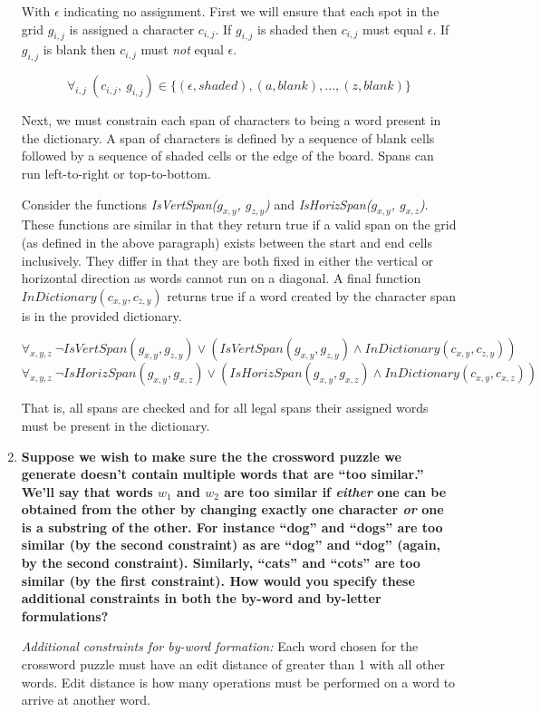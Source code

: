 \documentclass[11pt, letterpaper]{hw}
\begin{document}
\begin{enumerate}
With $\epsilon$ indicating no assignment. First we will ensure that each spot in the grid $g_{i ,j}$ is assigned a character $c_{i, j}$. If $g_{i, j}$ is shaded then $c_{i, j}$ must equal $\epsilon$. If $g_{i, j}$ is blank then $c_{i, j}$ must \textit{not} equal $\epsilon$.

$$\forall_{i, j} \ (c_{i, j}, \ g_{i, j}) \in \{(\epsilon, shaded), (a, blank), ... , (z, blank)\}$$

Next, we must constrain each span of characters to being a word present in the dictionary. A span of characters is defined by a sequence of blank cells followed by a sequence of shaded cells or the edge of the board. Spans can run left-to-right or top-to-bottom.

Consider the functions \textit{IsVertSpan($g_{x, y}$, $g_{z, y}$)} and \textit{IsHorizSpan($g_{x, y}$, $g_{x, z}$)}. These functions are similar in that they return true if a valid span on the grid (as defined in the above paragraph) exists between the start and end cells inclusively. They differ in that they are both fixed in either the vertical or horizontal direction as words cannot run on a diagonal. A final function $InDictionary(c_{x, y}, c_{z,y})$ returns true if a word created by the character span is in the provided dictionary.

$$\forall_{x, y, z} \ \neg IsVertSpan(g_{x, y}, g_{z, y}) \lor (IsVertSpan(g_{x, y}, g_{z, y}) \land InDictionary(c_{x, y}, c_{z,y}))$$
$$\forall_{x, y, z} \ \neg IsHorizSpan(g_{x, y}, g_{x, z}) \lor (IsHorizSpan(g_{x, y}, g_{x, z}) \land InDictionary(c_{x, y}, c_{x,z}))$$

That is, all spans are checked and for all legal spans their assigned words must be present in the dictionary.

\item \textbf{Suppose we wish to make sure the the crossword puzzle we generate
doesn't contain multiple words that are ``too similar.''  We'll say
that words $w_1$ and $w_2$ are too similar if \emph{either} one can be
obtained from the other by changing exactly one character \emph{or}
one is a substring of the other.  For instance ``dog'' and ``dogs''
are too similar (by the second constraint) as are ``dog'' and ``dog''
(again, by the second constraint).  Similarly, ``cats'' and ``cots''
are too similar (by the first constraint).  How would you specify
these additional constraints in both the by-word and by-letter
formulations?}

\textit{Additional constraints for by-word formation:} Each word chosen for the crossword puzzle must have an edit distance of greater than 1 with all other words. Edit distance is how many operations must be performed on a word to arrive at another word.


\end{enumerate}
\end{document}
